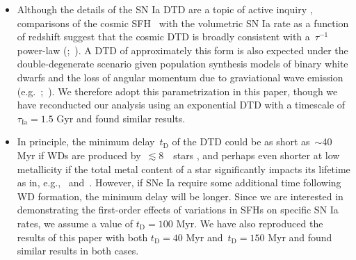 \documentclass[ms.tex]{subfiles}
\begin{document}
\begin{itemize}
	\item Although the details of the SN Ia DTD are a topic of active inquiry
	\citep[e.g.][]{Greggio2005, Strolger2020, Freundlich2021}, comparisons of
	the cosmic SFH~\citep[e.g.][]{Madau2014, Madau2017} with the volumetric SN
	Ia rate as a function of redshift suggest that the cosmic DTD is broadly
	consistent with a~$\tau^{-1}$ power-law (\citealp*{Maoz2012a, Maoz2012b,
	Graur2013};~\citealp{Graur2014}).
	A DTD of approximately this form is also expected under the
	double-degenerate scenario given population synthesis models of binary
	white dwarfs and the loss of angular momentum due to graviational wave
	emission (e.g.~\citealp{Mennekens2010};~\citealp*{Maoz2014}).
	We therefore adopt this parametrization in this paper, though we have
	reconducted our analysis using an exponential DTD with a timescale of
	$\tau_\text{Ia} = 1.5$ Gyr and found similar results.

	\item In principle, the minimum delay~$t_\text{D}$ of the DTD could be as
	short as~$\sim$40 Myr if WDs are produced by~$\lesssim$8~\msun~stars
	\citep*[e.g.][]{Hurley2000}, and perhaps even shorter at low metallicity if
	the total metal content of a star significantly impacts its lifetime as in,
	e.g.,~\citet{Kodama1997} and~\citet{Vincenzo2016}.
	However, if SNe Ia require some additional time following WD formation, the
	minimum delay will be longer.
	Since we are interested in demonstrating the first-order effects of
	variations in SFHs on specific SN Ia rates, we assume a value of
	$t_\text{D} = 100$ Myr.
	We have also reproduced the results of this paper with both
	$t_\text{D} = 40$ Myr and~$t_\text{D} = 150$ Myr and found similar results
	in both cases.


\end{itemize}
\end{document}
